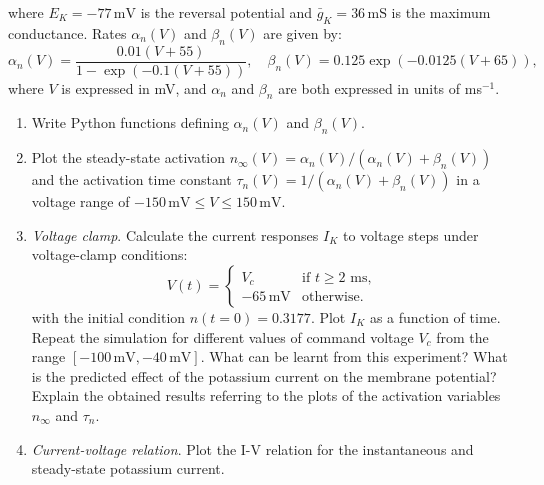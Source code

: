 \documentclass[12pt]{article}
\begin{document}
\begin{enumerate}
    where $E_K=-77\,\mathrm{mV}$ is the reversal potential and
    $\bar{g}_K=36\,\mathrm{mS}$ is the maximum conductance. Rates
    $\alpha_n(V)$ and $\beta_n(V)$ are given by:
    \begin{equation}
        \alpha_n(V)=\frac{0.01(V+55)}{1-\exp(-0.1(V+55))},\quad
        \beta_n(V)=0.125\exp(-0.0125(V+65)),
    \end{equation}
    where $V$ is expressed in mV, and $\alpha_n$ and $\beta_n$ are both
    expressed in units of ms$^{-1}$.
    \begin{enumerate}
        \item Write Python functions defining $\alpha_n(V)$ and $\beta_n(V)$.
        \item \label{ex:stedy-state} Plot the steady-state activation
            $n_\infty(V)=\alpha_n(V)/(\alpha_n(V)+\beta_n(V))$ and the
            activation time constant $\tau_n(V)=1/(\alpha_n(V)+\beta_n(V))$ in
            a voltage range of $-150\,\mathrm{mV}\leq V \leq 150\,\mathrm{mV}$.
        \item \textit{Voltage clamp}. Calculate the current responses
            $I_K$ to voltage steps under voltage-clamp conditions:
            \begin{equation}
                V(t)=
                \begin{cases} V_c & \text{if $t\geq2$ ms,} \\
                    -65\,\mathrm{mV} &\text{otherwise.}
                \end{cases}
                \label{eq:voltageclamp}
            \end{equation}
            with the initial condition $n(t=0)=0.3177$. Plot $I_K$ as a
            function of time. Repeat the simulation for different values of
            command voltage $V_c$ from the range  $[-100\,\mathrm{mV},
            -40\,\mathrm{mV}]$. What can be learnt from this experiment? What
            is the predicted effect of the potassium current on the membrane
            potential? Explain the obtained results referring to the plots of
            the activation variables $n_\infty$ and $\tau_n$.
        \item \textit{Current-voltage relation}. Plot the I-V relation for
            the instantaneous and steady-state potassium
            current.
    \end{enumerate}



\end{enumerate}
\end{document}
